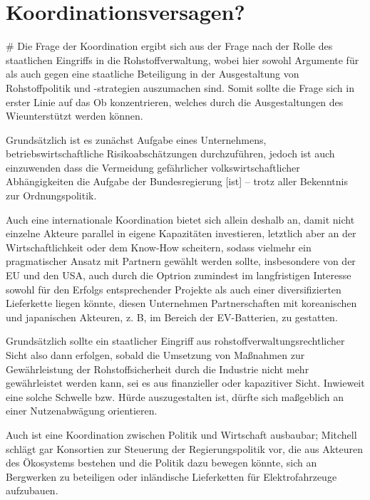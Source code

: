 \documentclass[12pt,a4paper,oneside]{book} %
\begin{document}
\section{Koordinationsversagen?}#
Die Frage der Koordination ergibt sich aus der Frage nach der Rolle des staatlichen Eingriffs in die Rohstoffverwaltung, wobei hier sowohl Argumente für als auch gegen eine staatliche Beteiligung in der Ausgestaltung von Rohstoffpolitik und -strategien auszumachen sind. Somit sollte die Frage sich in erster Linie auf das Ob konzentrieren, welches durch die Ausgestaltungen des \glqq Wie\grqq unterstützt werden können.

Grundsätzlich ist es zunächst Aufgabe eines Unternehmens, betriebswirtschaftliche Risikoabschätzungen durchzuführen, jedoch ist auch einzuwenden dass die \glqq Vermeidung gefährlicher volkswirtschaftlicher Abhängigkeiten die Aufgabe der Bundesregierung [ist] -- trotz aller Bekenntnis zur Ordnungspolitik\grqq.\autocite{Wirtschaft fordert mehr Tempo bei Rohstofffonds}

Auch eine internationale Koordination bietet sich allein deshalb an, damit nicht einzelne Akteure parallel in eigene Kapazitäten investieren, letztlich aber an der Wirtschaftlichkeit oder dem Know-How scheitern, sodass vielmehr ein pragmatischer Ansatz mit Partnern gewählt werden sollte, insbesondere von der EU und den USA, auch durch die Optrion zumindest im langfristigen Interesse sowohl für den Erfolgs entsprechender Projekte als auch einer diversifizierten Lieferkette liegen könnte, diesen Unternehmen Partnerschaften mit koreanischen und japanischen Akteuren, z. B, im Bereich der EV-Batterien, zu gestatten.\autocite{McBridge, S. 30.}

Grundsätzlich sollte ein staatlicher Eingriff aus rohstoffverwaltungsrechtlicher Sicht also dann erfolgen, sobald die Umsetzung von Maßnahmen zur Gewährleistung der Rohstoffsicherheit durch die Industrie nicht mehr gewährleistet werden kann, sei es aus finanzieller oder kapazitiver Sicht. Inwieweit eine solche Schwelle bzw. Hürde auszugestalten ist, dürfte sich maßgeblich an einer Nutzenabwägung orientieren.

Auch ist eine Koordination zwischen Politik und Wirtschaft ausbaubar; Mitchell schlägt gar Konsortien zur Steuerung der Regierungspolitik vor, die aus Akteuren des Ökosystems bestehen und die Politik dazu bewegen könnte, sich an Bergwerken zu beteiligen oder inländische Lieferketten für Elektrofahrzeuge aufzubauen.\autocite{Mitchell, Why mineral supply may be an e-mobility roadblock, EY}
\end{document}
